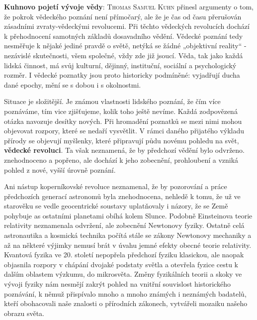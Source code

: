       \begin{tcnote}
        \textbf{Kuhnovo pojetí vývoje vědy}: \textsc{Thomas Samuel Kuhn} přinesl argumenty o tom,
        že pokrok vědeckého poznání není přímočarý, ale že je čas od času přerušován zásadními
        zvraty-vědeckými revolucemi. Při těchto vědeckých revolucích dochází k přehodnocení
        samotných základů dosavadního vědění. Vědecké poznání tedy nesměřuje k nějaké jediné
        pravdě o světě, netýká se žádné „objektivní reality“ - nezávislé skutečnosti, všem
        společné, vždy zde již jsoucí. Věda, tak jako každá lidská činnost, má svůj kulturní,
        dějinný, instituční, sociální a psychologický rozměr. I vědecké poznatky jsou proto
        historicky podmíněné: vyjadřují ducha dané epochy, mění se s dobou i s okolnostmi.

        {\centering
        \captionsetup{type=figure} 
        \label{fyz:fig0893}
      \par}
      \end{tcnote}

      Situace je složitější. Je známou vlastnosti lidského poznání, že čím více poznáváme, tím vice
      zjišťujeme, kolik toho ještě nevíme. Každá zodpovězená otázka navozuje desítky nových. Při
      hromadění poznatků se mezi nimi mohou objevovat rozpory, které se nedaří vysvětlit. V rámci
      daného přijatého výkladu přírody se objevují myšlenky, které připravují půdu novému pohledu na
      svět, \textbf{vědecké revoluci}. Ta však neznamená, že by předchozí vědění bylo odvrženo.
      znehodnoceno a popřeno, ale dochází k jeho zobecnění, prohloubení a vzniká pohled z nové,
      vyšší úrovně poznání.

      Ani nástup koperníkovské revoluce neznamenal, že by pozorování a práce předchozích generací
      astronomů byla znehodnocena, nehledě k tomu, že už ve starověku se vedle geocentrické soustavy
      uplatňovaly i názory, že se Země pohybuje as ostatními planetami obíhá kolem Slunce. Podobně
      Einsteinova teorie relativity neznamenala odvržení, ale zobecnění Newtonovy fyziky. Ostatně
      celá astronautika a kosmická technika počítá stále se zákony Newtonovy mechaniky a až na
      některé výjimky nemusí brát v úvahu jemné efekty obecné teorie relativity. Kvantová fyzika ve
      20. století nepopřela předchozí fyziku klasickou, ale naopak objasnila rozpory v chápání
      dvojaké podstaty světla a otevřela fyzice cestu k dalším oblastem výzkumu, do mikrosvěta.
      Změny fyzikálních teorii a skoky ve vývoji fyziky nám nesmějí zakrýt pohled na vnitřní
      souvislost historického poznávání, k němuž přispívalo mnoho a mnoho známých i neznámých
      badatelů, kteří obohacovali naše znalosti o přírodních zákonech, vytvářeli mozaiku našeho
      obrazu světa.

